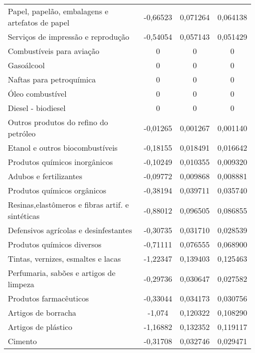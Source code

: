 \begin{apendicesenv}
\begin{small}
\begin{center}
\begin{longtable}{m{8cm}ccc}
				Papel, papelão, embalagens e artefatos de papel    & -0,66523 & 0,071264 & 0,064138 \\
				Serviços de impressão e reprodução                 & -0,54054 & 0,057143 & 0,051429 \\
				Combustíveis para aviação                          & 0 & 0 & 0 \\
				Gasoálcool                                         & 0 & 0 & 0 \\
				Naftas para petroquímica                           & 0 & 0 & 0 \\
				Óleo combustível                                   & 0 & 0 & 0 \\
				Diesel - biodiesel                                 & 0 & 0 & 0 \\
				Outros produtos do refino do petróleo              & -0,01265 & 0,001267 & 0,001140 \\
				Etanol e outros   biocombustíveis                  & -0,18155 & 0,018491 & 0,016642 \\
				Produtos químicos inorgânicos                      & -0,10249 & 0,010355 & 0,009320 \\
				Adubos e fertilizantes                             & -0,09772 & 0,009868 & 0,008881 \\
				Produtos químicos orgânicos                        & -0,38194 & 0,039711 & 0,035740 \\
				Resinas,elastômeros e fibras artif. e sintéticas   & -0,88012 & 0,096505 & 0,086855 \\
				Defensivos agrícolas e desinfestantes              & -0,30735 & 0,031710 & 0,028539 \\
				Produtos químicos diversos                         & -0,71111 & 0,076555 & 0,068900 \\
				Tintas, vernizes, esmaltes e lacas                 & -1,22347 & 0,139403 & 0,125463 \\
				Perfumaria, sabões e artigos de limpeza            & -0,29736 & 0,030647 & 0,027582 \\
				Produtos farmacêuticos                             & -0,33044 & 0,034173 & 0,030756 \\
				Artigos de borracha                                & -1,074 & 0,120322 & 0,108290 \\
				Artigos de plástico                                & -1,16882 & 0,132352 & 0,119117 \\
				Cimento                                            & -0,31708 & 0,032746 & 0,029471 \\

\end{longtable}
\end{center}
\end{small}
\end{apendicesenv}
